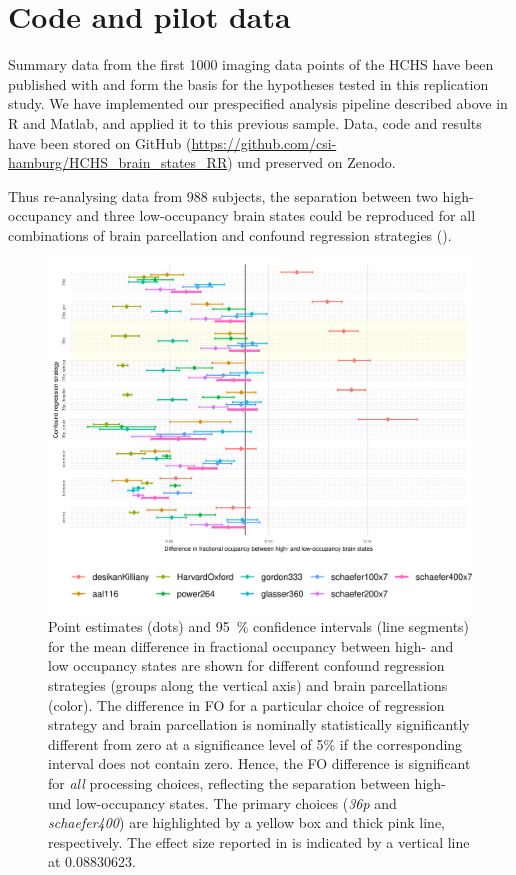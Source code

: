 \section{Code and pilot data}
Summary data from the first \num{1000} imaging data points of the HCHS have been published with \citep{Schlemm2022-he}  and form the basis for the hypotheses tested in this replication study.
We have implemented our prespecified analysis pipeline described above in R and Matlab, and applied it to this previous sample.
Data, code and results have been stored on GitHub (\url{https://github.com/csi-hamburg/HCHS_brain_states_RR}) und preserved on Zenodo.

Thus re-analysing data from \num{988} subjects, the separation between two high-occupancy and three low-occupancy brain states could be reproduced for all combinations of brain parcellation and confound regression strategies ().

\begin{figure}
    \includegraphics[width=\linewidth]{./../analysis/code/R/pipeline_files/figure-html/highVSlowFOplot-1.png}
    \caption{Point estimates (dots) and \qty{95}{\percent} confidence intervals (line segments) for the mean difference in fractional occupancy between high- and low occupancy states are shown for different confound regression strategies (groups along the vertical axis) and brain parcellations (color). 
    The difference in FO for a particular choice of regression strategy and brain parcellation is nominally statistically significantly different from zero at a significance level of 5\% if the corresponding interval does not contain zero. Hence, the FO difference is significant for \emph{all} processing choices, reflecting the separation between high- und low-occupancy states.
    The primary choices (\textit{36p} and \textit{schaefer400}) are highlighted by a yellow box and thick pink line, respectively. The effect size reported in \citep{Schlemm2022-he} is indicated by a vertical line at 0.08830623.}
    \label{fig:separation}
\end{figure}

